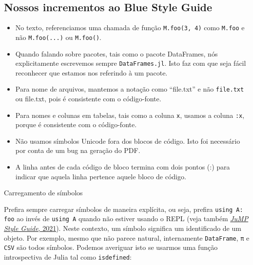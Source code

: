 \documentclass[
  notoc %
]{tufte-book}
\makeatletter
\providecommand{\tightlist}{%
  \setlength{\itemsep}{0pt}\setlength{\parskip}{0pt}
}
\newcommand{\passthrough}[1]{#1}
\renewcommand\subsubsection{%
\@startsection{subsubsection}{3}{\z@ }{-3.25ex\@plus -1ex \@minus -.2ex}{1.5ex \@plus .2ex}{\normalfont \normalsize \bfseries }
}
\makeatother
\begin{document}
\hypertarget{nossos-incrementos-ao-blue-style-guide}{%
\subsection{Nossos incrementos ao Blue Style
Guide}\label{nossos-incrementos-ao-blue-style-guide}}

\begin{itemize}
\tightlist
\item
  No texto, referenciamos uma chamada de função
  \passthrough{\lstinline!M.foo(3, 4)!} como
  \passthrough{\lstinline!M.foo!} e não
  \passthrough{\lstinline!M.foo(...)!} ou
  \passthrough{\lstinline!M.foo()!}.
\item
  Quando falando sobre pacotes, tais como o pacote DataFrames, nós
  explicitamente escrevemos sempre
  \passthrough{\lstinline!DataFrames.jl!}. Isto faz com que seja fácil
  reconhecer que estamos nos referindo à um pacote.
\item
  Para nome de arquivos, mantemos a notação como ``file.txt'' e não
  \passthrough{\lstinline!file.txt!} ou file.txt, pois é consistente com
  o código-fonte.
\item
  Para nomes e colunas em tabelas, tais como a coluna
  \passthrough{\lstinline!x!}, usamos a coluna
  \passthrough{\lstinline!:x!}, porque é consistente com o código-fonte.
\item
  Não usamos símbolos Unicode fora dos blocos de código. Isto foi
  necessário por conta de um bug na geração do PDF.
\item
  A linha antes de cada código de bloco termina com dois pontos (:) para
  indicar que aquela linha pertence aquele bloco de código.
\end{itemize}

\hypertarget{carregamento-de-suxedmbolos}{%
\subsubsection{Carregamento de
símbolos}\label{carregamento-de-suxedmbolos}}

Prefira sempre carregar símbolos de maneira explícita, ou seja, prefira
\passthrough{\lstinline!using A: foo!} ao invés de
\passthrough{\lstinline!using A!} quando não estiver usando o REPL (veja
também \protect\hyperlink{ref-jump2021using}{\emph{JuMP Style Guide},
2021}). Neste contexto, um símbolo significa um identificado de um
objeto. Por exemplo, mesmo que não parece natural, internamente
\passthrough{\lstinline!DataFrame!}, \passthrough{\lstinline!π!} e
\passthrough{\lstinline!CSV!} são todos símbolos. Podemos averiguar isto
se usarmos uma função introspectiva de Julia tal como
\passthrough{\lstinline!isdefined!}:
\end{document}
